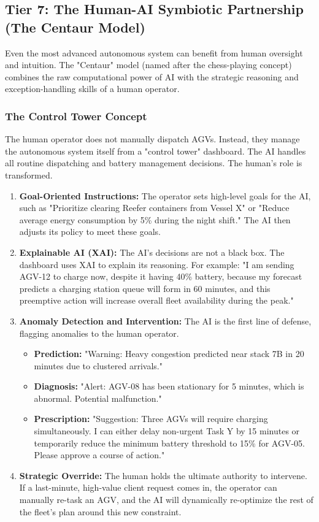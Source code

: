 \documentclass{article}
\begin{document}
\subsection*{Tier 7: The Human-AI Symbiotic Partnership (The Centaur Model)}
Even the most advanced autonomous system can benefit from human oversight and intuition. The "Centaur" model (named after the chess-playing concept) combines the raw computational power of AI with the strategic reasoning and exception-handling skills of a human operator.

\subsubsection*{The Control Tower Concept}
The human operator does not manually dispatch AGVs. Instead, they manage the autonomous system itself from a "control tower" dashboard. The AI handles all routine dispatching and battery management decisions. The human's role is transformed.

\begin{enumerate}
    \item \textbf{Goal-Oriented Instructions:} The operator sets high-level goals for the AI, such as "Prioritize clearing Reefer containers from Vessel X" or "Reduce average energy consumption by 5\% during the night shift." The AI then adjusts its policy to meet these goals.
    \item \textbf{Explainable AI (XAI):} The AI's decisions are not a black box. The dashboard uses XAI to explain its reasoning. For example: "I am sending AGV-12 to charge now, despite it having 40\% battery, because my forecast predicts a charging station queue will form in 60 minutes, and this preemptive action will increase overall fleet availability during the peak."
    \item \textbf{Anomaly Detection and Intervention:} The AI is the first line of defense, flagging anomalies to the human operator.
        \begin{itemize}
            \item \textbf{Prediction:} "Warning: Heavy congestion predicted near stack 7B in 20 minutes due to clustered arrivals."
            \item \textbf{Diagnosis:} "Alert: AGV-08 has been stationary for 5 minutes, which is abnormal. Potential malfunction."
            \item \textbf{Prescription:} "Suggestion: Three AGVs will require charging simultaneously. I can either delay non-urgent Task Y by 15 minutes or temporarily reduce the minimum battery threshold to 15\% for AGV-05. Please approve a course of action."
        \end{itemize}
    \item \textbf{Strategic Override:} The human holds the ultimate authority to intervene. If a last-minute, high-value client request comes in, the operator can manually re-task an AGV, and the AI will dynamically re-optimize the rest of the fleet's plan around this new constraint.
\end{enumerate}
\end{document}
